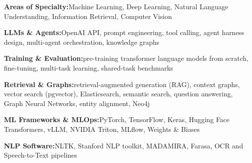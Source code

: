 



  \cventry
    {} %
    {} %
    {} %
    {} %
    {
      \begin{cvitems} %
        \item {\textbf{Areas of Specialty:}\atsspace Machine Learning, Deep Learning, Natural Language Understanding, Information Retrieval, Computer Vision}
        \item {\textbf{LLMs \& Agents:}\atsspace OpenAI API, prompt engineering, tool calling, agent harness design, multi-agent orchestration, knowledge graphs}
        \item {\textbf{Training \& Evaluation:}\atsspace pre-training transformer language models from scratch, fine-tuning, multi-task learning, shared-task benchmarks}
        \item {\textbf{Retrieval \& Graphs:}\atsspace retrieval-augmented generation (RAG), context graphs, vector search (pgvector), Elasticsearch, semantic search, question answering, Graph Neural Networks, entity alignment, Neo4j}
        \item {\textbf{ML Frameworks \& MLOps:}\atsspace PyTorch, TensorFlow, Keras, Hugging Face Transformers, vLLM, NVIDIA Triton, MLflow, Weights \& Biases}
        \item {\textbf{NLP Software:}\atsspace NLTK, Stanford NLP toolkit, MADAMIRA, Farasa, OCR and Speech-to-Text pipelines}

\end{cvitems}}
